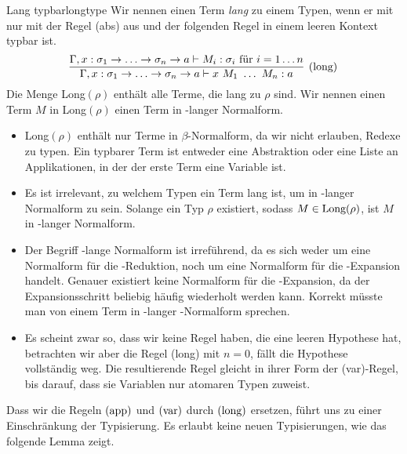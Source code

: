 \begin{definition}{Lang typbar\cite{dudenhefner}}{longtype}
    Wir nennen einen Term \emph{lang} zu einem Typen, wenn er mit nur mit der Regel (abs) aus  und der folgenden Regel in einem leeren Kontext typbar ist.
    \[\infer[\tlong]{\Gamma,x:\sigma_1\to\ldots\to\sigma_n\to a\vdash x~M_1~\ldots~M_n:a}{\Gamma,x:\sigma_1\to\ldots\to\sigma_n\to a\vdash M_i : \sigma_i \text{ für } i=1\ldots n}\]
    Die Menge Long$(\rho)$ enthält alle Terme, die lang zu $\rho$ sind. Wir nennen einen Term $M$ in Long$(\rho)$ einen Term in \teta-langer Normalform.
\end{definition}
\begin{remark}
    \begin{itemize}
        \item Long$(\rho)$ enthält nur Terme in $\beta$-Normalform, da wir nicht erlauben, Redexe zu typen. Ein typbarer Term ist entweder eine Abstraktion oder eine Liste an Applikationen, in der der erste Term eine Variable ist.   
        \item Es ist irrelevant, zu welchem Typen ein Term lang ist, um in \teta-langer Normalform zu sein. Solange ein Typ $\rho$ existiert, sodass $M\in\text{Long}(\rho)$, ist $M$ in \teta-langer Normalform.
        \item Der Begriff \teta-lange Normalform ist irreführend, da es sich weder um eine Normalform für die \teta-Reduktion, noch um eine Normalform für die \teta-Expansion handelt. Genauer existiert keine Normalform für die \teta-Expansion, da der Expansionsschritt beliebig häufig wiederholt werden kann. Korrekt müsste man von einem Term in \teta-langer \tbeta-Normalform sprechen.
        \item Es scheint zwar so, dass wir keine Regel haben, die eine leeren Hypothese hat, betrachten wir aber die Regel (long) mit $n = 0$, fällt die Hypothese vollständig weg. Die resultierende Regel gleicht in ihrer Form der (var)-Regel, bis darauf, dass sie Variablen nur atomaren Typen zuweist.
    \end{itemize}
\end{remark}

Dass wir die Regeln $\text{(app)}$ und $\text{(var)}$ durch $\text{(long)}$ ersetzen, führt uns zu einer Einschränkung der Typisierung. Es erlaubt keine neuen Typisierungen, wie das folgende Lemma zeigt.

